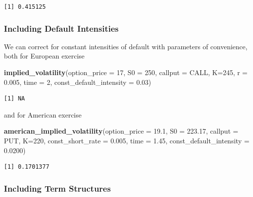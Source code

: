 \documentclass[]{article}
\newenvironment{Shaded}{\begin{snugshade}}{\end{snugshade}}
\newcommand{\KeywordTok}[1]{\textcolor[rgb]{0.13,0.29,0.53}{\textbf{#1}}}
\newcommand{\DataTypeTok}[1]{\textcolor[rgb]{0.13,0.29,0.53}{#1}}
\newcommand{\DecValTok}[1]{\textcolor[rgb]{0.00,0.00,0.81}{#1}}
\newcommand{\FloatTok}[1]{\textcolor[rgb]{0.00,0.00,0.81}{#1}}
\newcommand{\NormalTok}[1]{#1}
\begin{document}
\begin{verbatim}
[1] 0.415125
\end{verbatim}

\subsubsection{Including Default
Intensities}\label{including-default-intensities}

We can correct for constant intensities of default with parameters of
convenience, both for European exercise

\begin{Shaded}
\begin{Highlighting}[]
\KeywordTok{implied_volatility}\NormalTok{(}\DataTypeTok{option_price =} \DecValTok{17}\NormalTok{, }
                   \DataTypeTok{S0 =} \DecValTok{250}\NormalTok{, }\DataTypeTok{callput =}\NormalTok{ CALL,  }\DataTypeTok{K=}\DecValTok{245}\NormalTok{,}
                   \DataTypeTok{r =} \FloatTok{0.005}\NormalTok{, }\DataTypeTok{time =} \DecValTok{2}\NormalTok{,}
                   \DataTypeTok{const_default_intensity =} \FloatTok{0.03}\NormalTok{)}
\end{Highlighting}
\end{Shaded}

\begin{verbatim}
[1] NA
\end{verbatim}

and for American exercise

\begin{Shaded}
\begin{Highlighting}[]
\KeywordTok{american_implied_volatility}\NormalTok{(}\DataTypeTok{option_price =} \FloatTok{19.1}\NormalTok{, }
     \DataTypeTok{S0 =} \FloatTok{223.17}\NormalTok{, }\DataTypeTok{callput =}\NormalTok{ PUT, }\DataTypeTok{K=}\DecValTok{220}\NormalTok{, }
     \DataTypeTok{const_short_rate =} \FloatTok{0.005}\NormalTok{, }\DataTypeTok{time =} \FloatTok{1.45}\NormalTok{,}
     \DataTypeTok{const_default_intensity =} \FloatTok{0.0200}\NormalTok{)}
\end{Highlighting}
\end{Shaded}

\begin{verbatim}
[1] 0.1701377
\end{verbatim}

\subsubsection{Including Term
Structures}\label{including-term-structures}
\end{document}
